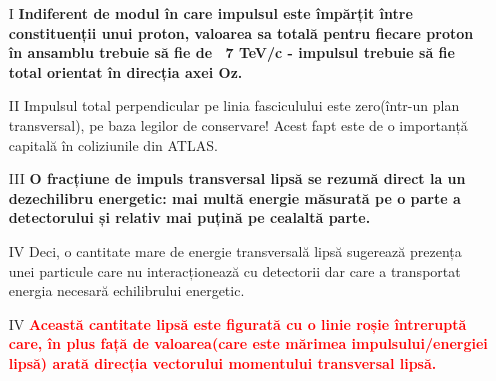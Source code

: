 \documentclass{beamer}
\begin{document}
\begin{frame}{}

\vspace{0cm}

\begin{enumerate}
  \small
  \item[I] \makebox[0.5cm]{} \textbf{ Indiferent de modul în care impulsul este împărțit între constituenții unui proton, valoarea sa totală pentru fiecare proton în ansamblu trebuie să fie de ~7 TeV/c - impulsul trebuie să fie total orientat în direcția axei Oz.}

  \item[II] \makebox[0.5cm]{} Impulsul total perpendicular pe linia fasciculului este zero(într-un plan transversal), pe baza legilor de conservare! Acest fapt este de o importanță capitală în coliziunile din ATLAS.

  \item[III] \makebox[0.5cm]{} \textbf{O fracțiune de impuls transversal lipsă se rezumă direct la un dezechilibru energetic: mai multă energie măsurată pe o parte a detectorului și relativ mai puțină pe cealaltă parte.}

  \item[IV] \makebox[0.5cm]{} Deci, o cantitate mare de energie transversală lipsă sugerează prezența unei particule care nu interacționează cu detectorii dar care a transportat energia necesară echilibrului energetic.

  \item[IV] \makebox[0.5cm]{} \textbf{\textcolor{red}{Această cantitate lipsă este figurată cu o linie roșie întreruptă care, în plus față de valoarea(care este mărimea impulsului/energiei lipsă) arată direcția vectorului momentului transversal lipsă.}}
\end{enumerate}

\end{frame}



\end{document}
